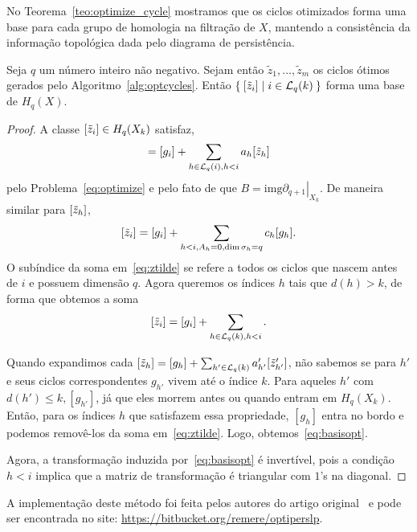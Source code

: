 No Teorema~\ref{teo:optimize_cycle} mostramos que os ciclos otimizados forma uma base para cada 
grupo de homologia na filtração de $X$, mantendo a consistência da informação topológica dada
pelo diagrama de persistência. 
\clearpage 
\begin{teo}\label{teo:optimize_cycle}
    Seja $q$ um número inteiro não negativo. Sejam então $\tilde{z}_1, \dots, \tilde{z}_m$ os 
    ciclos ótimos gerados pelo Algoritmo~\ref{alg:optcycles}. Então 
    $\Set{[\tilde{z}_i] | i \in \mathcal{L}_q(k)}$ forma uma base de $H_q(X)$.
\end{teo}
\begin{proof}
    A classe $[\tilde{z}_i] \in H_q(X_k)$ satisfaz, 
    \begin{equation*}
        [\ztilde_i] = [g_i] + \sum_{h\in \mathcal{L}_q(i), h<i} a_h[\ztilde_h]
    \end{equation*}
    pelo Problema~\ref{eq:optimize} e pelo fato de que $B = \text{img}\left.
    \partial_{q+1}\right|_{X_k}$. De maneira similar para $[\tilde{z}_h]$, 
    \begin{equation}\label{eq:ztilde}
        [\tilde{z}_i] = [g_i] + \sum_{h<i, A_h = 0, \dim\sigma_h = q} c_h [g_h]. 
    \end{equation}
    O subíndice da soma em~\eqref{eq:ztilde} se refere a todos os ciclos que nascem antes
    de $i$ e possuem dimensão $q$. Agora queremos os índices $h$ tais que $d(h) > k$, de 
    forma que obtemos a soma
    \begin{equation}\label{eq:basisopt}
        [\tilde{z}_i] = [g_i] + \sum_{h \in \mathcal{L}_q(k), h<i}.
    \end{equation}  
    
    Quando expandimos cada $[\tilde{z}_h] = [g_h] + \sum_{h' \in \mathcal{L}_q(k)} 
    a'_{h'}[\tilde{z}'_{h'}]$, não sabemos se para $h'$ e seus ciclos correspondentes
    $g_{h'}$ vivem até o índice $k$. Para aqueles $h'$ com $d(h') \leq k, [g_{h'}]$,
    já que eles morrem antes ou quando entram em $H_q(X_k)$. Então, para os índices $h$
    que satisfazem essa propriedade, $[g_h]$ entra no bordo e podemos removê-los da soma
    em~\eqref{eq:ztilde}. Logo, obtemos~\eqref{eq:basisopt}. 

    Agora, a transformação induzida por~\eqref{eq:basisopt} é invertível, pois a condição
    $h < i$ implica que a matriz de transformação é triangular com $1$'s na diagonal. 
\end{proof} 

A implementação deste método foi feita pelos autores do artigo original~\cite{Escolar2015} e
pode ser encontrada no site: \url{https://bitbucket.org/remere/optiperslp}.
